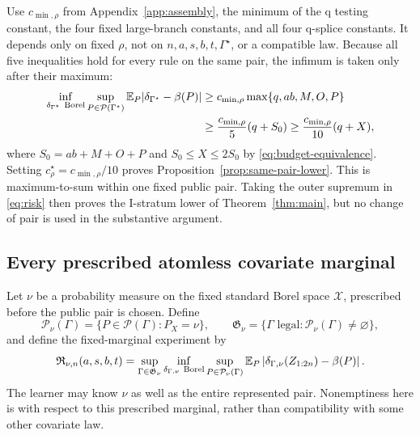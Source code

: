 Use \(c_{\min,\rho}\) from Appendix~\ref{app:assembly}, the minimum of the q
testing constant, the four fixed large-branch constants, and all four q-splice
constants.  It depends only on fixed
\(\rho\), not on \(n,a,s,b,t,\Gamma^\star\), or a compatible law.  Because
all five inequalities hold for every rule on the same pair, the infimum is
taken only after their maximum:
\[
\begin{split}
 \inf_{\delta_{\Gamma^\star}\ {\rm Borel}}
 \sup_{P\in\mathcal P(\Gamma^\star)}
 \mathbb E_P|\delta_{\Gamma^\star}-\beta(P)|
 &\ge c_{\min,\rho}\max\{q,ab,M,O,P\}\\
 &\ge\frac{c_{\min,\rho}}5(q+S_0)
 \ge\frac{c_{\min,\rho}}{10}(q+X),
\end{split}
\]
where \(S_0=ab+M+O+P\) and \(S_0\le X\le2S_0\) by
\eqref{eq:budget-equivalence}.  Setting
\(c_\rho^\star=c_{\min,\rho}/10\) proves
Proposition~\ref{prop:same-pair-lower}.  This is maximum-to-sum within one fixed
public pair.  Taking the outer supremum in \eqref{eq:risk} then proves the
I-stratum lower of Theorem~\ref{thm:main}, but no change of pair is used in
the substantive argument.

\subsection{Every prescribed atomless covariate marginal}
\label{app:fixed-nu}

Let \(\nu\) be a probability measure on the fixed standard Borel space
\(\mathcal X\), prescribed before the public pair is chosen.  Define
\[
 \mathcal P_\nu(\Gamma)
 =\{P\in\mathcal P(\Gamma):P_X=\nu\},\qquad
 \mathfrak G_\nu=\{\Gamma\text{ legal}:\mathcal P_\nu(\Gamma)\ne\varnothing\},
\]
and define the fixed-marginal experiment by
\begin{equation}
 \mathfrak R_{\nu,n}(a,s,b,t)
 =\sup_{\Gamma\in\mathfrak G_\nu}
   \inf_{\delta_{\Gamma,\nu}\ {\rm Borel}}
   \sup_{P\in\mathcal P_\nu(\Gamma)}
   \mathbb E_P\left|\delta_{\Gamma,\nu}(Z_{1:2n})-\beta(P)\right|.
 \label{eq:risk-fixed-nu}
\end{equation}
The learner may know \(\nu\) as well as the entire represented pair.
Nonemptiness here is with respect to this prescribed marginal, rather than
compatibility with some other covariate law.

